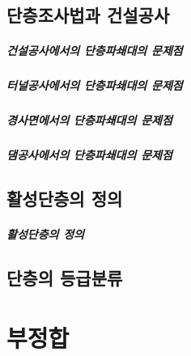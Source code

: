 \documentclass[12pt, a4paper, oneside]{book}
\begin{document}
	
	\clearpage
	\section{단층조사법과 건설공사}
	
	
	
	
		\paragraph{건설공사에서의 단층파쇄대의 문제점}
	
	
		\paragraph{터널공사에서의 단층파쇄대의 문제점}
	
		\paragraph{경사면에서의 단층파쇄대의 문제점}
	
		\paragraph{댐공사에서의 단층파쇄대의 문제점}
	



	\clearpage
	\section{활성단층의 정의}
	
		\paragraph{활성단층의 정의}



	\clearpage
	\section{단층의 등급분류}
	
	



	
	\clearpage
	\chapter{부정합}
	
\end{document}
